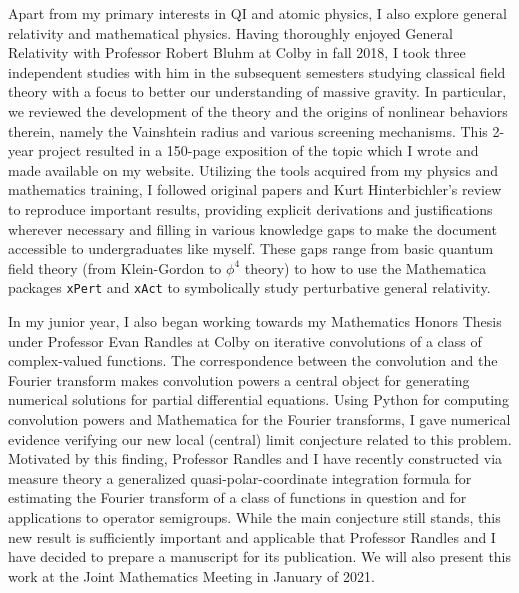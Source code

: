 \documentclass[12pt]{article}
\begin{document}
Apart from my primary interests in QI and atomic physics, I also explore general relativity and mathematical physics. Having thoroughly enjoyed General Relativity with Professor Robert Bluhm at Colby in fall 2018, I took three independent studies with him in the subsequent semesters studying classical field theory with a focus to better our understanding of massive gravity. In particular, we reviewed the development of the theory and the origins of nonlinear behaviors therein, namely the Vainshtein radius and various screening mechanisms. This 2-year project resulted in a 150-page exposition of the topic which I wrote and made available on my website. Utilizing the tools acquired from my physics and mathematics training, I followed original papers and Kurt Hinterbichler's review \cite{RevModPhys.84.671} to reproduce important results, providing explicit derivations and justifications wherever necessary and filling in various knowledge gaps to make the document accessible to undergraduates like myself. These gaps range from basic quantum field theory (from Klein-Gordon to $\phi^4$ theory) to how to use the Mathematica packages \texttt{xPert} and \texttt{xAct} to symbolically study perturbative general relativity. \\ \vspace{-9pt}

In my junior year, I also began working towards my Mathematics Honors Thesis under Professor Evan Randles at Colby on iterative convolutions of a class of complex-valued functions. The correspondence between the convolution and the Fourier transform makes convolution powers a central object for generating numerical solutions for partial differential equations. Using Python for computing convolution powers and Mathematica for the Fourier transforms, I gave numerical evidence verifying our new local (central) limit conjecture related to this problem. Motivated by this finding, Professor Randles and I have recently constructed via measure theory a generalized quasi-polar-coordinate integration formula for estimating the Fourier transform of a class of functions in question and for applications to operator semigroups. While the main conjecture still stands, this new result is sufficiently important and applicable that Professor Randles and I have decided to prepare a manuscript for its publication. We will also present this work at the Joint Mathematics Meeting in January of 2021. \\ \vspace{-9pt}
\end{document}

